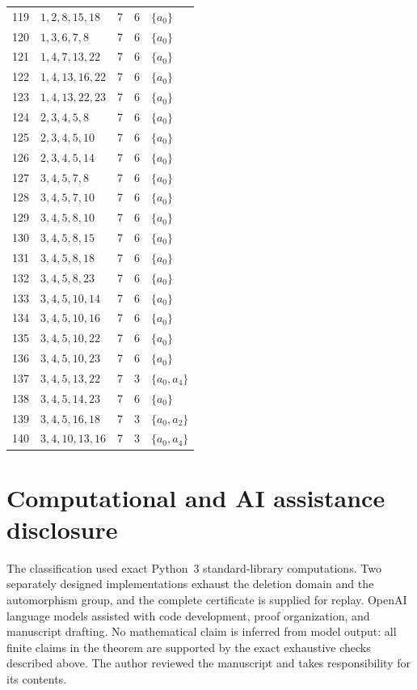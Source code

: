 \documentclass[10pt]{article}
\begin{document}
\begin{longtable}{@{}r l c c l@{}}
119 & $1,2,8,15,18$ & 7 & 6 & $\{a_{0}\}$\\
120 & $1,3,6,7,8$ & 7 & 6 & $\{a_{0}\}$\\
121 & $1,4,7,13,22$ & 7 & 6 & $\{a_{0}\}$\\
122 & $1,4,13,16,22$ & 7 & 6 & $\{a_{0}\}$\\
123 & $1,4,13,22,23$ & 7 & 6 & $\{a_{0}\}$\\
124 & $2,3,4,5,8$ & 7 & 6 & $\{a_{0}\}$\\
125 & $2,3,4,5,10$ & 7 & 6 & $\{a_{0}\}$\\
126 & $2,3,4,5,14$ & 7 & 6 & $\{a_{0}\}$\\
127 & $3,4,5,7,8$ & 7 & 6 & $\{a_{0}\}$\\
128 & $3,4,5,7,10$ & 7 & 6 & $\{a_{0}\}$\\
129 & $3,4,5,8,10$ & 7 & 6 & $\{a_{0}\}$\\
130 & $3,4,5,8,15$ & 7 & 6 & $\{a_{0}\}$\\
131 & $3,4,5,8,18$ & 7 & 6 & $\{a_{0}\}$\\
132 & $3,4,5,8,23$ & 7 & 6 & $\{a_{0}\}$\\
133 & $3,4,5,10,14$ & 7 & 6 & $\{a_{0}\}$\\
134 & $3,4,5,10,16$ & 7 & 6 & $\{a_{0}\}$\\
135 & $3,4,5,10,22$ & 7 & 6 & $\{a_{0}\}$\\
136 & $3,4,5,10,23$ & 7 & 6 & $\{a_{0}\}$\\
137 & $3,4,5,13,22$ & 7 & 3 & $\{a_{0},a_{4}\}$\\
138 & $3,4,5,14,23$ & 7 & 6 & $\{a_{0}\}$\\
139 & $3,4,5,16,18$ & 7 & 3 & $\{a_{0},a_{2}\}$\\
140 & $3,4,10,13,16$ & 7 & 3 & $\{a_{0},a_{4}\}$\\
\end{longtable}

\section*{Computational and AI assistance disclosure}

The classification used exact Python~3 standard-library computations.  Two
separately designed implementations exhaust the deletion domain and the
automorphism group, and the complete certificate is supplied for replay.
OpenAI language models assisted with code development, proof organization,
and manuscript drafting.  No mathematical claim is inferred from model output:
all finite claims in the theorem are supported by the exact exhaustive checks
described above.  The author reviewed the manuscript and takes responsibility
for its contents.



\end{document}

